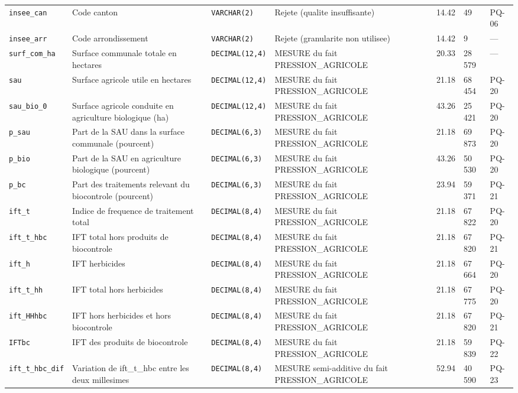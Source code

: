 {\begin{longtable}{@{}p{2.6cm}p{3.5cm}p{1.9cm}p{3.1cm}p{1.1cm}p{1.3cm}p{0.9cm}@{}}
\texttt{insee\_can} & Code canton & \texttt{VARCHAR(2)} & Rejete (qualite insuffisante) & 14.42 & 49 & PQ-06 \\
\texttt{insee\_arr} & Code arrondissement & \texttt{VARCHAR(2)} & Rejete (granularite non utilisee) & 14.42 & 9 & --- \\
\texttt{surf\_com\_ha} & Surface communale totale en hectares & \texttt{DECIMAL(12,4)} & MESURE du fait PRESSION\_AGRICOLE & 20.33 & 28 579 & --- \\
\texttt{sau} & Surface agricole utile en hectares & \texttt{DECIMAL(12,4)} & MESURE du fait PRESSION\_AGRICOLE & 21.18 & 68 454 & PQ-20 \\
\texttt{sau\_bio\_0} & Surface agricole conduite en agriculture biologique (ha) & \texttt{DECIMAL(12,4)} & MESURE du fait PRESSION\_AGRICOLE & 43.26 & 25 421 & PQ-20 \\
\texttt{p\_sau} & Part de la SAU dans la surface communale (pourcent) & \texttt{DECIMAL(6,3)} & MESURE du fait PRESSION\_AGRICOLE & 21.18 & 69 873 & PQ-20 \\
\texttt{p\_bio} & Part de la SAU en agriculture biologique (pourcent) & \texttt{DECIMAL(6,3)} & MESURE du fait PRESSION\_AGRICOLE & 43.26 & 50 530 & PQ-20 \\
\texttt{p\_bc} & Part des traitements relevant du biocontrole (pourcent) & \texttt{DECIMAL(6,3)} & MESURE du fait PRESSION\_AGRICOLE & 23.94 & 59 371 & PQ-21 \\
\texttt{ift\_t} & Indice de frequence de traitement total & \texttt{DECIMAL(8,4)} & MESURE du fait PRESSION\_AGRICOLE & 21.18 & 67 822 & PQ-20 \\
\texttt{ift\_t\_hbc} & IFT total hors produits de biocontrole & \texttt{DECIMAL(8,4)} & MESURE du fait PRESSION\_AGRICOLE & 21.18 & 67 820 & PQ-21 \\
\texttt{ift\_h} & IFT herbicides & \texttt{DECIMAL(8,4)} & MESURE du fait PRESSION\_AGRICOLE & 21.18 & 67 664 & PQ-20 \\
\texttt{ift\_t\_hh} & IFT total hors herbicides & \texttt{DECIMAL(8,4)} & MESURE du fait PRESSION\_AGRICOLE & 21.18 & 67 775 & PQ-20 \\
\texttt{ift\_HHhbc} & IFT hors herbicides et hors biocontrole & \texttt{DECIMAL(8,4)} & MESURE du fait PRESSION\_AGRICOLE & 21.18 & 67 820 & PQ-21 \\
\texttt{IFTbc} & IFT des produits de biocontrole & \texttt{DECIMAL(8,4)} & MESURE du fait PRESSION\_AGRICOLE & 21.18 & 59 839 & PQ-22 \\
\texttt{ift\_t\_hbc\_dif} & Variation de ift\_t\_hbc entre les deux millesimes & \texttt{DECIMAL(8,4)} & MESURE semi-additive du fait PRESSION\_AGRICOLE & 52.94 & 40 590 & PQ-23 \\

\end{longtable}}

